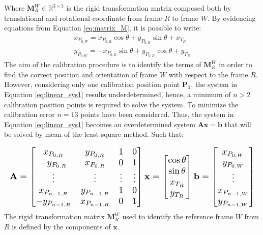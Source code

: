 \documentclass[letterpaper, 10 pt, conference]{ieeeconf}  %
\begin{document}
Where $\mathbf{M}^W_{R}\in\mathbb{R}^{3\times3}$ is the rigid transformation matrix composed both by translational and rotational coordinate from frame $R$ to frame $W$. By evidencing equations from Equation \ref{eq:matrix_M}, it is possible to write:
\begin{equation}\label{eq:linear_sys1}
\begin{gathered}
x_{P_{0,W}}=x_{P_{0,R}}\cos\theta+y_{P_{0,R}}\sin\theta+x_{T_R}\\
y_{P_{0,W}}=-x_{P_{0,R}}\sin\theta+y_{P_{0,R}}\cos\theta+y_{T_R}
\end{gathered}
\end{equation}
The aim of the calibration procedure is to identify the terms of $\mathbf{M}^W_{R}$ in order to find the correct position and orientation of frame $W$ with respect to the frame $R$. However, considering only one calibration position point $\mathbf{P_1}$, the system in Equation \ref{eq:linear_sys1} results underdetermined, hence, a minimum of $n>2$ calibration position points is required to solve the system. To minimize the calibration error $n=13$ points have been considered. Thus, the system in Equation \ref{eq:linear_sys1} becomes an overdetermined system $\mathbf{A}\mathbf{x}=\mathbf{b}$ that will be solved by mean of the least square method. Such that:

\begin{equation}\label{eq:linear_sys2}
\resizebox{\columnwidth}{!}{$%
	\begin{gathered}
	\mathbf{A} =   \begin{bmatrix}
	x_{P_{0,R}} & y_{P_{0,R}} & 1 & 0\\
	-y_{P_{0,R}} & x_{P_{0,R}} & 0 & 1 \\
	\vdots & \vdots & \vdots & \vdots\\
	x_{P_{n-1,R}} & y_{P_{n-1,R}} & 1 & 0\\
	-y_{P_{n-1,R}} & x_{P_{n-1,R}} & 0 & 1 
	\end{bmatrix}
	\mathbf{x} =   \begin{bmatrix}
	\cos\theta\\
	\sin\theta\\
	x_{T_R}\\
	y_{T_R}
	\end{bmatrix}
	\mathbf{b} =   \begin{bmatrix}
	x_{P_{0,W}}\\
	y_{P_{0,W}}\\
	\vdots\\
	x_{P_{n-1,W}}\\
	y_{P_{n-1,W}}\\
	\end{bmatrix}
	\end{gathered}
	$%
}%
\end{equation}
The rigid transformation matrix $\mathbf{M}^W_{R}$ used to identify the reference frame $W$ from $R$ is defined by the components of $\mathbf{x}$.
\end{document}
